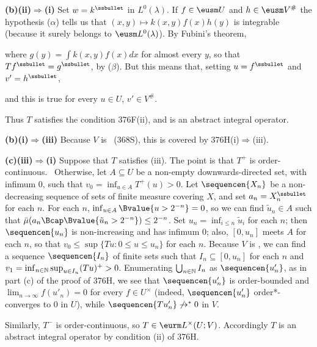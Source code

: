 {\medskip

{\bf (b)(ii)$\Rightarrow$(i)} Set $w=k^{\ssbullet}$ in $L^0(\lambda)$.
If $f\in\eusm U$ and $h\in\eusm V^{\#}$ the hypothesis ($\alpha$)
tells us that $(x,y)\mapsto k(x,y)f(x)h(y)$ is integrable (because it
surely belongs to $\eusm L^0(\lambda)$).   By Fubini's theorem,


\noindent where $g(y)=\int k(x,y)f(x)dx$ for almost every $y$, so that
$Tf^{\ssbullet}=g^{\ssbullet}$, by ($\beta$).   But this means that,
setting $u=f^{\ssbullet}$ and $v'=h^{\ssbullet}$,


\noindent and this is true for every $u\in U$, $v'\in V^{\#}$.

Thus $T$ satisfies the condition 376F(ii), and is an abstract integral
operator.

\medskip

{\bf (b)(i)$\Rightarrow$(iii)} Because $V$ is \wsid\ (368S), this is
covered by 376H(i)$\Rightarrow$(iii).

\medskip

{\bf (c)(iii)$\Rightarrow$(i)} Suppose that $T$ satisfies (iii).   The
point is that $T^+$ is order-continuous.   \Prf\Quer\
Otherwise, let $A\subseteq U$ be a
non-empty downwards-directed set, with infimum $0$, such that
$v_0=\inf_{u\in A}T^+(u)>0$.   Let $\sequencen{X_n}$ be a non-decreasing
sequence of sets of finite measure covering $X$, and set
$a_n=X_n^{\ssbullet}$ for each $n$.   For each $n$,
$\inf_{u\in A}\Bvalue{u>2^{-n}}=0$, so we can find $\tilde u_n\in A$
such that $\bar\mu(a_n\Bcap\Bvalue{\tilde u_n>2^{-n}})\le 2^{-n}$.   Set
$u_n=\inf_{i\le n}\tilde u_i$ for each $n$;  then $\sequencen{u_n}$ is
non-increasing and has infimum $0$;  also, $[0,u_n]$ meets $A$ for each
$n$, so that $v_0\le\sup\{Tu:0\le u\le u_n\}$ for each $n$.   Because
$V$ is \wsid, we can find a sequence $\sequencen{I_n}$
of finite sets such that $I_n\subseteq[0,u_n]$ for each $n$ and
$v_1=\inf_{n\in\Bbb N}\sup_{u\in I_n}(Tu)^+>0$.   Enumerating
$\bigcup_{n\in\Bbb N}I_n$ as $\sequencen{u'_n}$, as in part (c) of the
proof of 376H, we see that $\sequencen{u'_n}$ is order-bounded and
$\lim_{n\to\infty}f(u'_n)=0$ for every $f\in U^{\times}$ (indeed,
$\sequencen{u'_n}$ order*-converges to $0$ in $U$), while
$\sequencen{Tu'_n}\not\to^* 0$ in $V$.\ \Bang\Qed

Similarly, $T^-$ is order-continuous, so $T\in\eurm L^{\times}(U;V)$.
Accordingly $T$ is an abstract integral operator by condition (ii) of
376H.
}%

